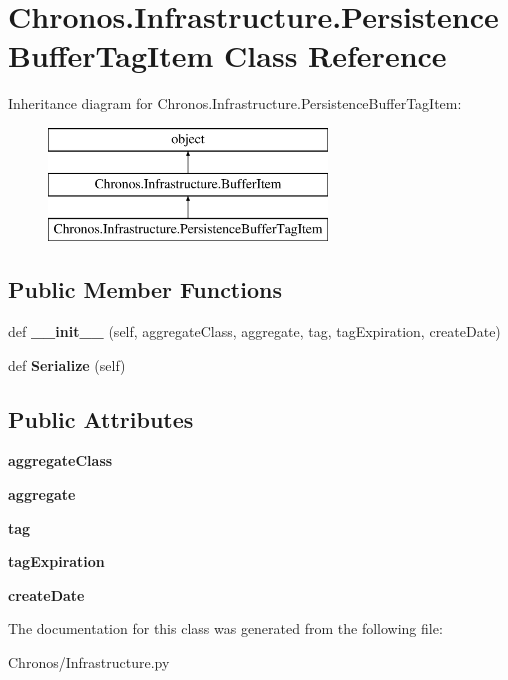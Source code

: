\hypertarget{classChronos_1_1Infrastructure_1_1PersistenceBufferTagItem}{}\section{Chronos.\+Infrastructure.\+Persistence\+Buffer\+Tag\+Item Class Reference}
\label{classChronos_1_1Infrastructure_1_1PersistenceBufferTagItem}
Inheritance diagram for Chronos.\+Infrastructure.\+Persistence\+Buffer\+Tag\+Item\+:\begin{figure}[H]
\begin{center}
\leavevmode
\includegraphics[height=3.000000cm]{classChronos_1_1Infrastructure_1_1PersistenceBufferTagItem}
\end{center}
\end{figure}
\subsection*{Public Member Functions}
\begin{DoxyCompactItemize}
\item 
def {\bfseries \+\_\+\+\_\+init\+\_\+\+\_\+} (self, aggregate\+Class, aggregate, tag, tag\+Expiration, create\+Date)
\item 
def {\bfseries Serialize} (self)
\end{DoxyCompactItemize}
\subsection*{Public Attributes}
\begin{DoxyCompactItemize}
\item 
{\bfseries aggregate\+Class}
\item 
{\bfseries aggregate}
\item 
{\bfseries tag}
\item 
{\bfseries tag\+Expiration}
\item 
{\bfseries create\+Date}
\end{DoxyCompactItemize}


The documentation for this class was generated from the following file\+:\begin{DoxyCompactItemize}
\item 
Chronos/Infrastructure.\+py\end{DoxyCompactItemize}
